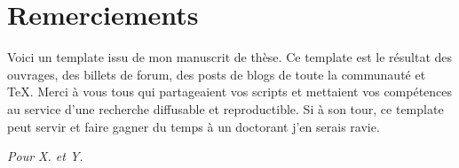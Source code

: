\chapter*{Remerciements}

Voici un template issu de mon manuscrit de thèse. Ce template est le résultat des ouvrages, des billets de forum, des posts de blogs de toute la communauté \R{} et \TeX{}. Merci à vous tous qui partageaient vos scripts et mettaient vos compétences au service d'une recherche diffusable et reproductible.  Si à son tour, ce template peut servir et faire gagner du temps à un doctorant j'en serais ravie. 

\begin{vcenterpage}
\begin{flushright}
\textit{Pour X. et Y.}
\end{flushright}
\end{vcenterpage}